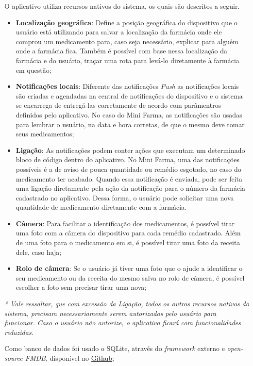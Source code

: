 O aplicativo utiliza recursos nativos do sistema, os quais são descritos a seguir. 
\begin{itemize}
	\item \textbf{Localização geográfica}: Define a posição geográfica do dispositivo que o usuário está utilizando para salvar a 
    localização da farmácia onde ele comprou um medicamento para, caso seja necessário, explicar para alguém onde a 
    farmácia fica. Também é possível com base nessa localização da farmácia e do usuário, traçar uma rota para levá-lo diretamente à 
    farmácia em questão;
	\item \textbf{Notificações locais}: Diferente das notificações \textit{Push} as notificações locais são criadas e agendadas na central 
    de notificações do dispositivo e o sistema se encarrega de entregá-las corretamente de acordo com parâmentros definidos pelo aplicativo. 
    No caso do Mini Farma, as notificações são usadas para lembrar o usuário, na data e hora corretas, de que o mesmo deve tomar seus medicamentos;
	\item \textbf{Ligação}: As notificações podem conter ações que executam um determinado bloco de código dentro do aplicativo. No Mini Farma, 
    uma das notificações possíveis é a de aviso de pouca quantidade ou remédio esgotado, no caso do medicamento ter acabado. 
    Quando essa notificação é enviada, pode ser feita uma ligação diretamente pela ação da notificação para o número da 
    farmácia cadastrado no aplicativo. Dessa forma, o usuário pode solicitar uma nova quantidade de medicamento diretamente com a farmácia. 
	\item \textbf{Câmera}: Para facilitar a identificação dos medicamentos, é possível tirar uma foto com a câmera do dispositivo para 
    cada remédio cadastrado. Além de uma foto para o medicamento em si, é possível tirar uma foto da receita dele, caso haja;
    \item \textbf{Rolo de câmera}: Se o usuário já tiver uma foto que o ajude a identificar o seu medicamento ou da receita do mesmo salva 
    no rolo de câmera, é possível escolher a foto sem precisar tirar uma nova;
\end{itemize}

\textit{* Vale ressaltar, que com excessão da Ligação, todos os outros recursos nativos do sistema, precisam necessariamente serem autorizados pelo
usuário para funcionar. Caso o usuário não autorize, o aplicativo ficará com funcionalidades reduzidas.} 


Como banco de dados foi usado o SQLite, através do \textit{framework} externo e \textit{open-source FMDB}, 
disponível no \href{https://github.com/ccgus/fmdb}{Github};

